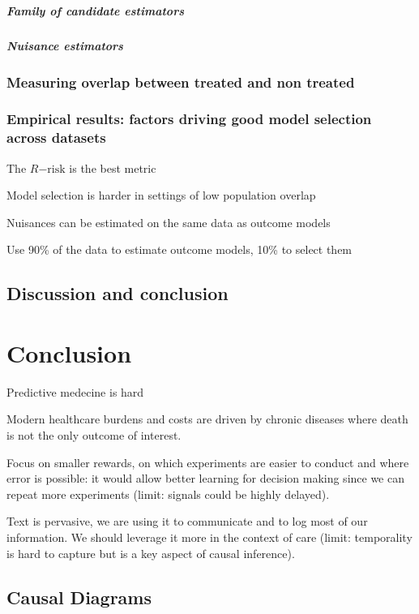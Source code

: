 \documentclass{report}
\begin{document}
\paragraph{Family of candidate estimators}
\paragraph{Nuisance estimators}

\subsection{Measuring overlap between treated and non treated}\label{subsec:causal_model_selection:overlap}

\subsection{Empirical results: factors driving good model selection across
  datasets}\label{subsec:causal_model_selection:empirical_results}


The $R\mathrm{-risk}$ is the best metric

Model selection is harder in settings of low population overlap

Nuisances can be estimated on the same data as outcome
models

Use 90\% of the data to estimate outcome models, 10\% to select them

\section{Discussion and conclusion}\label{sec:causal_model_selection:discussion}


\chapter{Conclusion}\label{chapter:conclusion}

Predictive medecine is hard

Modern healthcare burdens and costs are driven by chronic diseases where death
is not the only outcome of interest.

Focus on smaller rewards, on which experiments are easier to conduct and where
error is possible: it would allow better learning for decision making since we
can repeat more experiments (limit: signals could be highly delayed).

Text is pervasive, we are using it to communicate and to log most of our
information. We should leverage it more in the context of care (limit:
temporality is hard to capture but is a key aspect of causal inference).


\printbibliography

\appendix

\clearpage

\section{Causal Diagrams}
\end{document}
